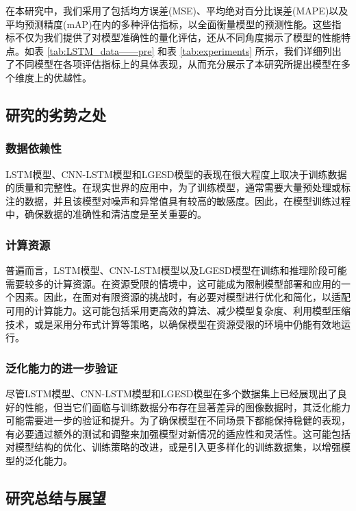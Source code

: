 在本研究中，我们采用了包括均方误差(MSE)、平均绝对百分比误差(MAPE)以及平均预测精度(mAP)在内的多种评估指标，以全面衡量模型的预测性能。这些指标不仅为我们提供了对模型准确性的量化评估，还从不同角度揭示了模型的性能特点。如表 \ref{tab:LSTM_data——pre} 和表 \ref{tab:experiments} 所示，我们详细列出了不同模型在各项评估指标上的具体表现，从而充分展示了本研究所提出模型在多个维度上的优越性。



\subsection{研究的劣势之处}

\subsubsection{数据依赖性}
LSTM模型、CNN-LSTM模型和LGESD模型的表现在很大程度上取决于训练数据的质量和完整性。在现实世界的应用中，为了训练模型，通常需要大量预处理或标注的数据，并且该模型对噪声和异常值具有较高的敏感度。因此，在模型训练过程中，确保数据的准确性和清洁度是至关重要的。

\subsubsection{计算资源}
普遍而言，LSTM模型、CNN-LSTM模型以及LGESD模型在训练和推理阶段可能需要较多的计算资源。在资源受限的情境中，这可能成为限制模型部署和应用的一个因素。因此，在面对有限资源的挑战时，有必要对模型进行优化和简化，以适配可用的计算能力。这可能包括采用更高效的算法、减少模型复杂度、利用模型压缩技术，或是采用分布式计算等策略，以确保模型在资源受限的环境中仍能有效地运行。

\subsubsection{泛化能力的进一步验证}
尽管LSTM模型、CNN-LSTM模型和LGESD模型在多个数据集上已经展现出了良好的性能，但当它们面临与训练数据分布存在显著差异的图像数据时，其泛化能力可能需要进一步的验证和提升。为了确保模型在不同场景下都能保持稳健的表现，有必要通过额外的测试和调整来加强模型对新情况的适应性和灵活性。这可能包括对模型结构的优化、训练策略的改进，或是引入更多样化的训练数据集，以增强模型的泛化能力。



\subsection{研究总结与展望}

